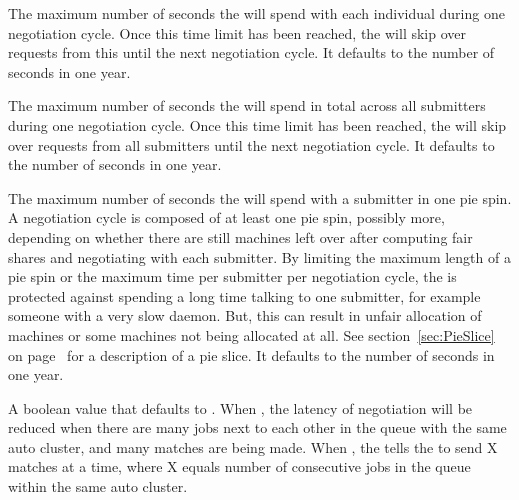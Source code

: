 \begin{description}
\label{param:NegotiatorMaxTimePerSchedd}
\item[\Macro{NEGOTIATOR\_MAX\_TIME\_PER\_SCHEDD}]
  The maximum number of seconds the 
  will spend with each individual  during one
  negotiation cycle.  Once this time limit has been reached, the
   will skip
  over requests from this  until the next negotiation cycle.
  It defaults to the number of seconds in one year.

\label{param:NegotiatorMaxTimePerCycle}
\item[\Macro{NEGOTIATOR\_MAX\_TIME\_PER\_CYCLE}]
  The maximum number of seconds
  the  will spend in total across all submitters during one
  negotiation cycle.  Once this time limit has been reached, the
   will skip
  over requests from all submitters until the next negotiation cycle.
  It defaults to the number of seconds in one year.

\label{param:NegotiatorMaxTimePerPieSpin}
\item[\Macro{NEGOTIATOR\_MAX\_TIME\_PER\_PIESPIN}]
  The maximum number of seconds the
   will spend with a submitter in one pie spin.
  A negotiation cycle is composed of at least one pie spin, possibly more,
  depending on whether there are still machines left over after
  computing fair shares and negotiating with each submitter.  By
  limiting the maximum length of a pie spin or the maximum time per
  submitter per negotiation cycle, the  is protected
  against spending a long time talking to one submitter, for example someone
  with a very slow  daemon.
  But, this can result in unfair allocation of
  machines or some machines not being allocated at all.
  See section~\ref{sec:PieSlice} on page~\pageref{sec:PieSlice}
  for a description of a pie slice.
  It defaults to the number of seconds in one year.

\label{param:UseResourceRequestCounts}
\item[\Macro{USE\_RESOURCE\_REQUEST\_COUNTS}]
  A boolean value that defaults to . 
  When ,
  the latency of negotiation will be reduced 
  when there are many jobs next to each other in the queue
  with the same auto cluster, and many matches are being made.
  When ,
  the  tells the  
  to send X matches at a time,
  where X equals number of consecutive jobs in the queue 
  within the same auto cluster.


\end{description}
